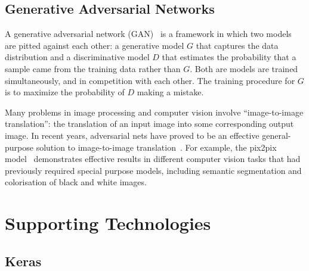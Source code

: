 \subsection{Generative Adversarial Networks}

A generative adversarial network (GAN)~\cite{gans} is a framework in which two models are pitted against each other: a generative model $G$ that captures the data distribution and a discriminative model $D$ that estimates the probability that a sample came from the training data rather than $G$. Both are models are trained simultaneously, and in competition with each other. The training procedure for $G$ is to maximize the probability of $D$ making a mistake.

Many problems in image processing and computer vision involve ``image-to-image translation'': the translation of an input image into some corresponding output image. In recent years, adversarial nets have proved to be an effective general-purpose solution to image-to-image translation~\cite{gansoverview}. For example, the pix2pix model~\cite{pix2pix} demonstrates effective results in different computer vision tasks that had previously required special purpose models, including semantic segmentation and colorisation of black and white images.




\section{Supporting Technologies}

\subsection{Keras}

